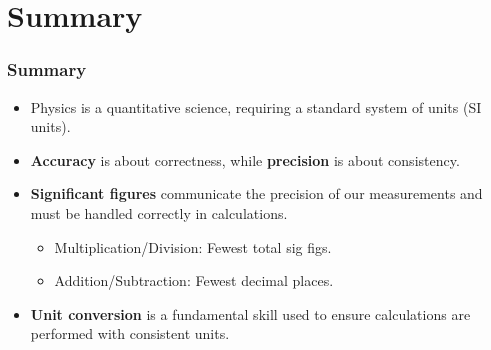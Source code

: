 \documentclass{beamer}
\begin{document}
\section{Summary}
\begin{frame}
    \frametitle{Summary}
    \begin{itemize}
        \item Physics is a quantitative science, requiring a standard system of units (SI units).
        \medskip
        \item \textbf{Accuracy} is about correctness, while \textbf{precision} is about consistency.
        \medskip
        \item \textbf{Significant figures} communicate the precision of our measurements and must be handled correctly in calculations.
        \begin{itemize}
            \item Multiplication/Division: Fewest total sig figs.
            \item Addition/Subtraction: Fewest decimal places.
        \end{itemize}
        \medskip
        \item \textbf{Unit conversion} is a fundamental skill used to ensure calculations are performed with consistent units.
    \end{itemize}
\end{frame}
\end{document}
